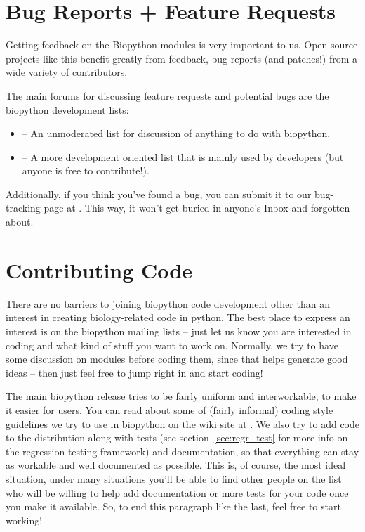 \documentclass{report}
\begin{document}
\section{Bug Reports + Feature Requests}

Getting feedback on the Biopython modules is very important to us. Open-source projects like this benefit greatly from feedback, bug-reports (and patches!) from a wide variety of contributors.


The main forums for discussing feature requests and potential bugs are the biopython development lists:

\begin{itemize}
  \item {} -- An unmoderated list for discussion of anything to do with biopython.

  \item {} -- A more development oriented list that is mainly used by developers (but anyone is free to contribute!).
\end{itemize}

Additionally, if you think you've found a bug, you can submit it to our bug-tracking page at . This way, it won't get buried in anyone's Inbox and forgotten about.

\section{Contributing Code}

There are no barriers to joining biopython code development other than an interest in creating biology-related code in python. The best place to express an interest is on the biopython mailing lists -- just let us know you are interested in coding and what kind of stuff you want to work on. Normally, we try to have some discussion on modules before coding them, since that helps generate good ideas -- then just feel free to jump right in and start coding!


The main biopython release tries to be fairly uniform and interworkable, to make it easier for users. You can read about some of (fairly informal) coding style guidelines we try to use in biopython on the wiki site at . We also try to add code to the distribution along with tests (see section~\ref{sec:regr_test} for more info on the regression testing framework) and documentation, so that everything can stay as workable and well documented as possible. This is, of course, the most ideal situation, under many situations you'll be able to find other people on the list who will be willing to help add documentation or more tests for your code once you make it available. So, to end this paragraph like the last, feel free to start working!
\end{document}
